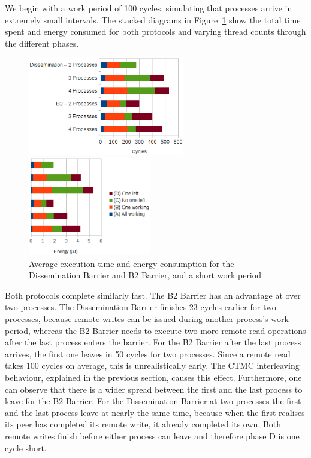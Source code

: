 \documentclass[a4paper, 10pt]{article}
\begin{document}
We begin with a work period of 100 cycles, simulating that processes arrive in extremely small intervals.
The stacked diagrams in Figure~\ref{fig:d2-work-100-partition} show the total time spent and energy consumed for both protocols and varying thread counts through the different phases.
\begin{figure}[htbp]
	\centering
	\begin{minipage}{0.54\linewidth}
		\includegraphics[height=4.3cm]{charts/d2-time-work-100-partition}
	\end{minipage}
	\begin{minipage}{0.45\linewidth}
		\includegraphics[height=4.3cm]{charts/d2-energy-work-100-partition}
	\end{minipage}
	\caption{Average execution time and energy consumption for the Dissemination Barrier and B2 Barrier, and a short work period}
	\label{fig:d2-work-100-partition}
\end{figure}
Both protocols complete similarly fast. The B2 Barrier has an advantage at over two processes.
The Dissemination Barrier finishes 23 cycles earlier for two processes, because remote writes can be issued during another process's work period, whereas the B2 Barrier needs to execute two more remote read operations after the last process enters the barrier.
For the B2 Barrier after the last process arrives, the first one leaves in 50 cycles for two processes. Since a remote read takes 100 cycles on average, this is unrealistically early. The CTMC interleaving behaviour, explained in the previous section, causes this effect.
Furthermore, one can observe that there is a wider spread between the first and the last process to leave for the B2 Barrier.
For the Dissemination Barrier at two processes the first and the last process leave at nearly the same time, because when the first realises its peer has completed its remote write, it already completed its own. Both remote writes finish before either process can leave and therefore phase D is one cycle short.
\end{document}
